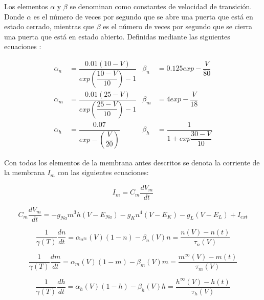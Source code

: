Los elementos \(\alpha\) y \(\beta\) se denominan como constantes de velocidad de transición. Donde \(\alpha\) es el número de veces por segundo que se abre una puerta que está en estado cerrado, mientras que \(\beta\) es el número de veces por segundo que se cierra una puerta que está en estado abierto. Definidas mediante las siguientes ecuaciones \parencite{HH}:

\begin{align*}
\alpha_{n}&=\dfrac{0.01(10-V)}{exp(\dfrac{10-V}{10})-1}           &  \beta_{n}&=0.125exp-\dfrac{V}{80}\\
\alpha_{m}&=\dfrac{0.01(25-V)}{exp(\dfrac{25-V}{10})-1}                    &  \beta_{m}&=4exp-\dfrac{V}{18}\\
\alpha_{h}&=\dfrac{0.07}{exp-(\dfrac{V}{20})}              &  \beta_{h}&=\dfrac{1}{1+exp\dfrac{30-V}{10}}
\end{align*}

Con todos los elementos de la membrana antes descritos se denota la corriente de la membrana $I_{m}$ con las siguientes ecuaciones\parencite{HH52}:

\begin{equation}
  I_{m} = C_{m} \dfrac{dV_{m}}{dt}
  \label{eq:corrientesEnLaMembrana}
\end{equation}


\begin{equation}
  C_{m} \dfrac{dV_{m}}{dt} =  - g_{Na} m^3 h(V - E_{Na} ) - g_{K} n^4 (V - E_{K} ) - g_{L} (V - E_{L} ) + I_{ext}
  \label{eq:corrientesEnLaMembrana2}
\end{equation}

\begin{equation}
  \dfrac{1}{\gamma(T)}\dfrac{dn}{dt} =  \alpha_{n^\infty} (V)(1 - n) - \beta_{n} (V) n = \dfrac{n(V)-n(t)}{\tau_{n}(V)}
  \label{eq:corrientesEnLaMembrana3}
\end{equation}

\begin{equation}
  \dfrac{1}{\gamma(T)}\dfrac{dm}{dt} =  \alpha_{m} (V)(1 - m) - \beta_{m} (V) m = \dfrac{m^\infty(V)-m(t)}{\tau_{m}(V)}
  \label{eq:corrientesEnLaMembrana4}
\end{equation}

\begin{equation}
  \dfrac{1}{\gamma(T)}\dfrac{dh}{dt} =  \alpha_{h} (V)(1 - h) - \beta_{h} (V) h = \dfrac{h^\infty(V)-h(t)}{\tau_{h}(V)}
  \label{eq:corrientesEnLaMembrana5}
\end{equation}


